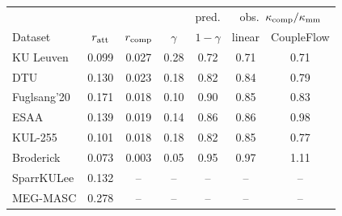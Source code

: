 \begin{tabular}{lcccc|cc}\toprule
 & & & & pred. & \multicolumn{2}{c}{obs.\ $\kappa_{\rm comp}/\kappa_{\rm mm}$} \\
Dataset & $r_{\rm att}$ & $r_{\rm comp}$ & $\gamma$ & $1-\gamma$ & linear & CoupleFlow \\\midrule
KU Leuven & 0.099 & 0.027 & 0.28 & 0.72 & 0.71 & 0.71 \\
DTU & 0.130 & 0.023 & 0.18 & 0.82 & 0.84 & 0.79 \\
Fuglsang'20 & 0.171 & 0.018 & 0.10 & 0.90 & 0.85 & 0.83 \\
ESAA & 0.139 & 0.019 & 0.14 & 0.86 & 0.86 & 0.98 \\
KUL-255 & 0.101 & 0.018 & 0.18 & 0.82 & 0.85 & 0.77 \\
Broderick & 0.073 & 0.003 & 0.05 & 0.95 & 0.97 & 1.11 \\
SparrKULee & 0.132 & -- & -- & -- & -- & -- \\
MEG-MASC & 0.278 & -- & -- & -- & -- & -- \\
\bottomrule\end{tabular}
